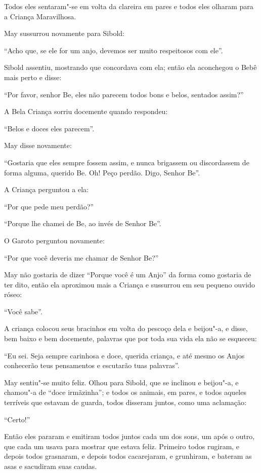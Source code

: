 Todos eles sentaram"-se em volta da clareira em pares e todos eles
olharam para a Criança Maravilhosa.

May sussurrou novamente para Sibold:

``Acho que, se ele for um anjo, devemos ser muito respeitosos com ele''.

Sibold assentiu, mostrando que concordava com ela; então ela aconchegou
o Bebê mais perto e disse:

``Por favor, senhor Be, eles não parecem todos bons e belos, sentados
assim?''

A Bela Criança sorriu docemente quando respondeu:

``Belos e doces eles parecem''.

May disse novamente:

``Gostaria que eles sempre fossem assim, e nunca brigassem ou
discordassem de forma alguma, querido Be. Oh! Peço perdão. Digo, Senhor
Be''.

A Criança perguntou a ela:

``Por que pede meu perdão?''

``Porque lhe chamei de Be, ao invés de Senhor Be''.

O Garoto perguntou novamente:

``Por que você deveria me chamar de Senhor Be?''

May não gostaria de dizer ``Porque você é um Anjo'' da forma como
gostaria de ter dito, então ela aproximou mais a Criança e sussurrou em
seu pequeno ouvido róseo:

``Você sabe''.

A criança colocou seus bracinhos em volta do pescoço dela e beijou"-a, e
disse, bem baixo e bem docemente, palavras que por toda sua vida ela não
se esqueceu:

``Eu sei. Seja sempre carinhosa e doce, querida criança, e até mesmo os
Anjos conhecerão teus pensamentos e escutarão tuas palavras''.

May sentiu"-se muito feliz. Olhou para Sibold, que se inclinou e
beijou"-a, e chamou"-a de ``doce irmãzinha''; e todos os animais, em
pares, e todos aqueles terríveis que estavam de guarda, todos disseram
juntos, como uma aclamação:

``Certo!''

Então eles pararam e emitiram todos juntos cada um dos sons, um após o
outro, que cada um usava para mostrar que estava feliz. Primeiro todos
rugiram, e depois todos grasnaram, e depois todos cacarejaram, e
grunhiram, e bateram as asas e sacudiram suas caudas.

